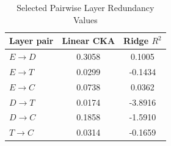 \begin{table}[!t]
\caption{Selected Pairwise Layer Redundancy Values}
\label{tab:redundancy}
\centering
\footnotesize
\begin{tabular}{lcc}
\hline
Layer pair & Linear CKA & Ridge $R^2$ \\
\hline
$E \rightarrow D$ & 0.3058 & 0.1005 \\
$E \rightarrow T$ & 0.0299 & -0.1434 \\
$E \rightarrow C$ & 0.0738 & 0.0362 \\
$D \rightarrow T$ & 0.0174 & -3.8916 \\
$D \rightarrow C$ & 0.1858 & -1.5910 \\
$T \rightarrow C$ & 0.0314 & -0.1659 \\
\hline
\end{tabular}
\end{table}
